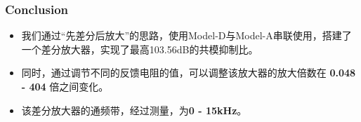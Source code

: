 
	\subsubsection{Conclusion}
	\begin{itemize}
		\item 我们通过“先差分后放大”的思路，使用Model-D与Model-A串联使用，搭建了一个差分放大器，实现了最高103.56dB的共模抑制比。
		\item 同时，通过调节不同的反馈电阻的值，可以调整该放大器的放大倍数在 \textbf{0.048 - 404} 倍之间变化。
		\item 该差分放大器的通频带，经过测量，为\textbf{0 - 15kHz}。
	\end{itemize}



	

	

	
